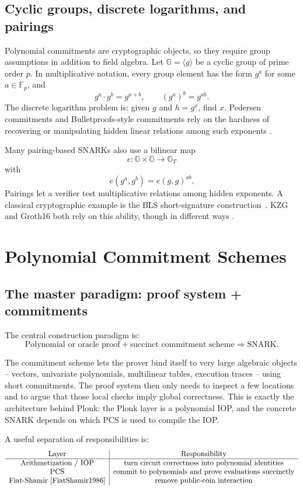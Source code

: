 \documentclass[11pt]{article}
\newcommand{\F}{\mathbb{F}}
\newcommand{\G}{\mathbb{G}}
\newcommand{\GT}{\mathbb{G}_T}
\begin{document}
\subsection{Cyclic groups, discrete logarithms, and pairings}

Polynomial commitments are cryptographic objects, so they require group assumptions in addition to field algebra. Let $\G=\langle g\rangle$ be a cyclic group of prime order $p$. In multiplicative notation, every group element has the form $g^a$ for some $a\in\F_p$, and
\[
    g^a\cdot g^b = g^{a+b},
    \qquad
    (g^a)^b=g^{ab}.
\]
The discrete logarithm problem is: given $g$ and $h=g^x$, find $x$. Pedersen commitments and Bulletproofs-style commitments rely on the hardness of recovering or manipulating hidden linear relations among such exponents \cite{Pedersen1991,Bulletproofs2018}.

Many pairing-based SNARKs also use a bilinear map
\[
    e:\G\times\G\to\GT
\]
with
\[
    e(g^a,g^b)=e(g,g)^{ab}.
\]
Pairings let a verifier test multiplicative relations among hidden exponents. A classical cryptographic example is the BLS short-signature construction~\cite{BonehLynnShacham2001}. KZG and Groth16 both rely on this ability, though in different ways \cite{KateZaveruchaGoldberg2010,Groth2016}.

\section{Polynomial Commitment Schemes}

\subsection{The master paradigm: proof system + commitments}

The central construction paradigm is:
\[
\boxed{\text{Polynomial or oracle proof} + \text{succinct commitment scheme} \Longrightarrow \text{SNARK}.}
\]

The commitment scheme lets the prover bind itself to very large algebraic objects -- vectors, univariate polynomials, multilinear tables, execution traces -- using short commitments. The proof system then only needs to inspect a few locations and to argue that those local checks imply global correctness. This is exactly the architecture behind Plonk: the Plonk layer is a polynomial IOP, and the concrete SNARK depends on which PCS is used to compile the IOP.

A useful separation of responsibilities is:
\[
\begin{array}{c|c}
\text{Layer} & \text{Responsibility}\\
\hline
\text{Arithmetization / IOP} & \text{turn circuit correctness into polynomial identities}\\
\text{PCS} & \text{commit to polynomials and prove evaluations succinctly}\\
\text{Fiat-Shamir \cite{FiatShamir1986}} & \text{remove public-coin interaction}\\
\end{array}
\]
\end{document}
